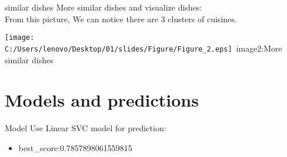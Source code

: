 \documentclass[
 size=14pt,
 paper=smartboard,  %
 mode=present, 		%
 display=slides, 	%
 style=tuliplab,  	%
 pauseslide,
 fleqn,leqno]{powerdot}
\begin{document}
\begin{slide}{similar dishes}
  More similar dishes and visualize dishes:\\
  From this picture, We can notice there are 3 clusters of cuisines.
  \begin{table} 
      \texttt{[image: C:/Users/lenovo/Desktop/01/slides/Figure/Figure\_2.eps]}\
        {image2:More similar dishes}\
  \end{table}  

\end{slide}
\section{Models and predictions}


%
\begin{slide}[toc=,bm=]{Model}
 Use Linear SVC model for prediction:\\
 \begin{itemize}
  \item best_score:0.7857898061559815 \\
\end{itemize}
\end{slide}






\end{document}
